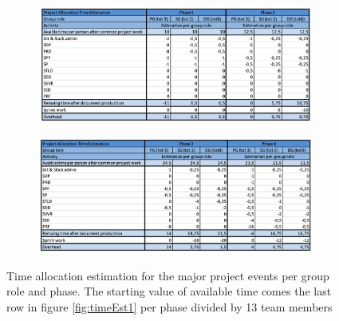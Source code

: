 \documentclass{article}
\begin{document}
\begin{figure}[h!]
     \centering
     \begin{subfigure}{\textwidth}
         \centering
         \includegraphics[width=\textwidth]{sdpFigures/TimeEstPart2V2.png}
         \label{fig:y equals x}
     \end{subfigure}
     \hfill
     \begin{subfigure}{\textwidth}
         \centering
         \includegraphics[width=\textwidth]{sdpFigures/TimeEstPart3V2.png}
         \label{fig:five over x}
     \end{subfigure}
        \caption{Time allocation estimation for the major project events per group role and phase. The starting value of available time comes the last row in figure \ref{fig:timeEst1} per phase divided by 13 team members}
        \label{fig:timeEst2}
\end{figure}
\end{document}
